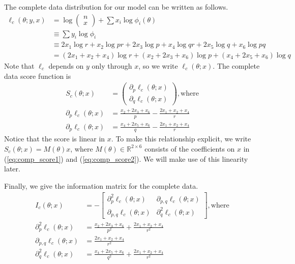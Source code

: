 \documentclass[11pt, oneside]{article}   	%
\newcommand{\bR}{\mathbb{R}}
\begin{document}
\begin{appendices}
    The complete data distribution for our model can be written as follows.
    \begin{align}
        \ell_c(\theta; y,x) &= \log \begin{pmatrix} n \\ x \end{pmatrix} + \sum x_i \log \phi_i(\theta)\\
        & \equiv \sum y_i \log \phi_i\\
        &\equiv 2 x_1 \log r + x_2 \log pr + 2 x_3 \log p + x_4 \log qr + 2 x_5 \log q + x_6 \log pq\\
        &= (2 x_1 + x_2 + x_4) \log r + (x_2 + 2 x_3 + x_6) \log p + (x_4 + 2 x_5 + x_6) \log q
    \end{align}
    Note that $\ell_c$ depends on $y$ only through $x$, so we write $\ell_c(\theta; x)$. The complete data score function is
    \begin{align}
        S_c(\theta; x) &= \begin{pmatrix}
            \partial_p \ell_c(\theta; x)\\
            \partial_q \ell_c(\theta; x) 
        \end{pmatrix} \mathrm{, where}\\
        \partial_p \ell_c(\theta; x) &= \frac{x_2 + 2 x_3 + x_6}{p} - \frac{2x_1 + x_2 + x_4}{r} \label{eq:comp_score1}\\
        \partial_p \ell_c(\theta; x) &= \frac{x_4 + 2 x_5 + x_6}{q} - \frac{2x_1 + x_2 + x_4}{r} \label{eq:comp_score2}
    \end{align}
    Notice that the score is linear in $x$. To make this relationship explicit, we write $S_c(\theta; x) = M(\theta) x$, where $M(\theta) \in \bR^{2 \times 6}$ consists of the coefficients on $x$ in (\ref{eq:comp_score1}) and (\ref{eq:comp_score2}). We will make use of this linearity later.

    Finally, we give the information matrix for the complete data.
    \begin{align}
        I_c(\theta;x) &= - \begin{bmatrix}
            \partial^2_p \ell_c(\theta; x) & \partial_{p,q} \ell_c(\theta; x)\\
            \partial_{p,q} \ell_c(\theta; x) & \partial^2_q \ell_c(\theta; x)
        \end{bmatrix} \mathrm{, where}\\
        \partial^2_p \ell_c(\theta; x) &=  \frac{x_2 + 2 x_3 + x_6}{p^2} + \frac{2x_1 + x_2 + x_4}{r^2}\\
        \partial_{p,q} \ell_c(\theta; x) &=   \frac{2x_1 + x_2 + x_4}{r^2}\\
        \partial^2_q \ell_c(\theta; x) &=  \frac{x_4 + 2 x_5 + x_6}{q^2} + \frac{2x_1 + x_2 + x_4}{r^2}
    \end{align}


\end{appendices}
\end{document}
